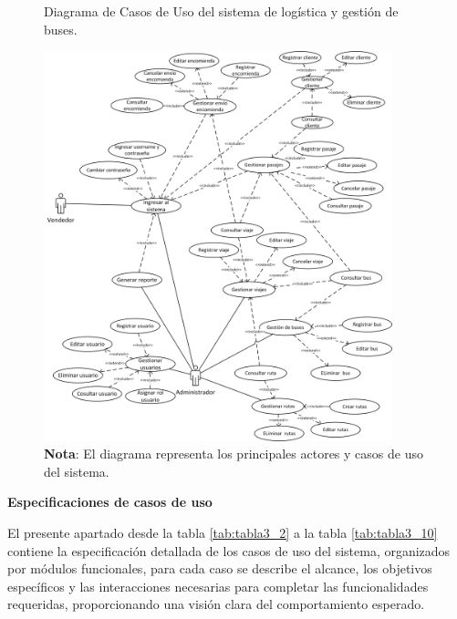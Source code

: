 	\begin{figure}[!h] %
		\caption[Diagrama de Casos de Uso]
		{\newline Diagrama de Casos de Uso del sistema de logística y gestión de buses.} %
		\vspace{0.3cm}
		\centering
		\includegraphics[width=0.9\textwidth]{imagenes/cap_3/casos_de_uso.png} %
		\vspace{0.3cm}
		\caption*{\textup{\textbf{Nota}: El diagrama representa los principales actores y casos de uso del sistema.}}
		\vspace{-0.8cm}
		\label{fig:caso_uso} %
	\end{figure}
	
	\noindent \textbf{Especificaciones de casos de uso}
	
	El presente apartado desde la tabla \ref{tab:tabla3_2} a la tabla \ref{tab:tabla3_10} contiene la especificación detallada de los casos de uso del sistema, organizados por módulos funcionales, para cada caso se describe el alcance, los objetivos específicos y las interacciones necesarias para completar las funcionalidades requeridas, proporcionando una visión clara del comportamiento esperado.
	
